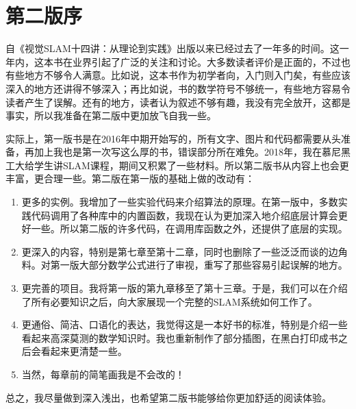 \thispagestyle{empty}
\chapter*{第二版序}
自《视觉SLAM十四讲：从理论到实践》出版以来已经过去了一年多的时间。这一年内，这本书在业界引起了广泛的关注和讨论。大多数读者评价是正面的，不过也有些地方不够令人满意。比如说，这本书作为初学者向，入门则入门矣，有些应该深入的地方还讲得不够深入；再比如说，书的数学符号不够统一，有些地方容易令读者产生了误解。还有的地方，读者认为叙述不够有趣，我没有完全放开，这都是事实，所以我准备在第二版中更加放飞自我一些。

实际上，第一版书是在2016年中期开始写的，所有文字、图片和代码都需要从头准备，再加上我也是第一次写这么厚的书，错误部分所在难免。2018年，我在慕尼黑工大给学生讲SLAM课程，期间又积累了一些材料。所以第二版书从内容上也会更丰富，更合理一些。第二版在第一版的基础上做的改动有：
\begin{enumerate}
\item 更多的实例。我增加了一些实验代码来介绍算法的原理。在第一版中，多数实践代码调用了各种库中的内置函数，我现在认为更加深入地介绍底层计算会更好一些。所以第二版的许多代码，在调用库函数之外，还提供了底层的实现。
\item 更深入的内容，特别是第七章至第十二章，同时也删除了一些泛泛而谈的边角料。对第一版大部分数学公式进行了审视，重写了那些容易引起误解的地方。
\item 更完善的项目。我将第一版的第九章移至了第十三章。于是，我们可以在介绍了所有必要知识之后，向大家展现一个完整的SLAM系统如何工作了。
\item 更通俗、简洁、口语化的表达，我觉得这是一本好书的标准，特别是介绍一些看起来高深莫测的数学知识时。我也重新制作了部分插图，在黑白打印成书之后会看起来更清楚一些。
\item 当然，每章前的简笔画我是不会改的！
\end{enumerate}

总之，我尽量做到深入浅出，也希望第二版书能够给你更加舒适的阅读体验。

\clearpage